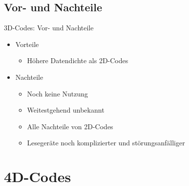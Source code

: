 \subsection{Vor- und Nachteile}
\begin{frame}{3D-Codes: Vor- und Nachteile}
	\begin{itemize}
	\item Vorteile
		\begin{itemize}
		\item Höhere Datendichte als 2D-Codes
		\end{itemize}
	\item Nachteile
		\begin{itemize}
		\item Noch keine Nutzung
		\item Weitestgehend unbekannt
		\item Alle Nachteile von 2D-Codes
		\item Lesegeräte noch komplizierter und störungsanfälliger
		\end{itemize}
	\end{itemize}
\end{frame}

\section{4D-Codes}

